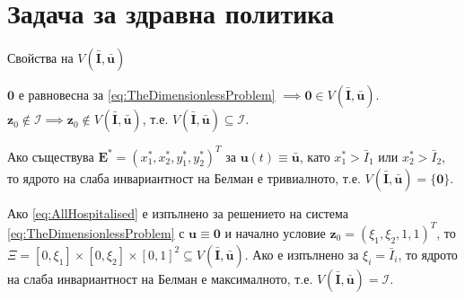 \section{\hspace{1em}Задача за здравна политика}

\begin{frame}[t]{Свойства на $V(\bar{\boldsymbol{I}}, \bar{\boldsymbol{u}})$}

  $\pmb{0}$ е равновесна за \eqref{eq:TheDimensionlessProblem} $\implies \pmb{0} \in V(\bar{\boldsymbol{I}}, \bar{\boldsymbol{u}})$. \\
  $\boldsymbol{z}_0 \notin \mathscr{I} \implies \boldsymbol{z}_0 \notin V(\bar{\boldsymbol{I}}, \bar{\boldsymbol{u}})$, т.е. $V(\bar{\boldsymbol{I}}, \bar{\boldsymbol{u}}) \subseteq \mathscr{I}$.

  \begin{proposition}
    Ако съществува $\boldsymbol{E}^* = (x_1^*, x_2^*, y_1^*, y_2^*)^T$ за $\boldsymbol{u}(t) \equiv \bar{\boldsymbol{u}}$, като $x_1^* > \bar{I}_1$ или $x_2^* > \bar{I}_2$, то ядрото на слаба инвариантност на Белман е тривиалното, т.е. $V(\bar{\boldsymbol{I}}, \bar{\boldsymbol{u}}) = \{\pmb{0}\}$.
  \end{proposition}


  \begin{proposition}
    Ако \eqref{eq:AllHospitalised} е изпълнено за решението на система \eqref{eq:TheDimensionlessProblem} с $\boldsymbol{u} \equiv \pmb{0}$ и начално условие $\boldsymbol{z}_0 = (\xi_1, \xi_2, 1, 1)^T$, то $\Xi = [0, \xi_1] \times [0, \xi_2] \times [0, 1]^2 \subseteq V(\bar{\boldsymbol{I}}, \bar{\boldsymbol{u}})$.
    Ако е изпълнено за $\xi_i = \bar{I}_i$, то ядрото на слаба инвариантност на Белман е максималното, т.е. $V(\bar{\boldsymbol{I}}, \bar{\boldsymbol{u}}) = \mathscr{I}$.
  \end{proposition}

\end{frame}

